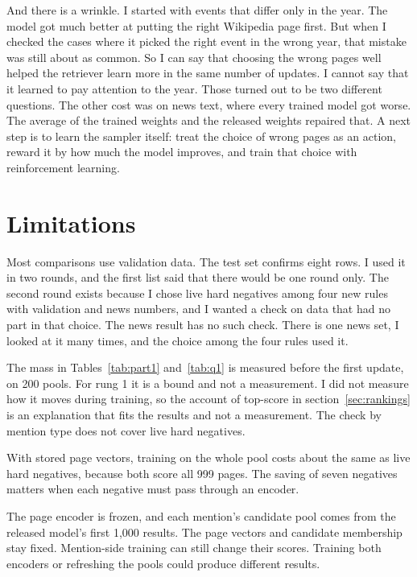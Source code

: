\documentclass[11pt]{article}
\theoremstyle{definition}
\begin{document}
And there is a wrinkle. I started with events that differ only in the year. The model got much better at putting the right Wikipedia page first. But when I checked the cases where it picked the right event in the wrong year, that mistake was still about as common. So I can say that choosing the wrong pages well helped the retriever learn more in the same number of updates. I cannot say that it learned to pay attention to the year. Those turned out to be two different questions. The other cost was on news text, where every trained model got worse. The average of the trained weights and the released weights repaired that. A next step is to learn the sampler itself: treat the choice of wrong pages as an action, reward it by how much the model improves, and train that choice with reinforcement learning.

\section*{Limitations}

Most comparisons use validation data. The test set confirms eight rows. I used it in two rounds, and the first list said that there would be one round only. The second round exists because I chose live hard negatives among four new rules with validation and news numbers, and I wanted a check on data that had no part in that choice. The news result has no such check. There is one news set, I looked at it many times, and the choice among the four rules used it.

The mass in Tables~\ref{tab:part1} and~\ref{tab:q1} is measured before the first update, on 200 pools. For rung 1 it is a bound and not a measurement. I did not measure how it moves during training, so the account of top-score in section~\ref{sec:rankings} is an explanation that fits the results and not a measurement. The check by mention type does not cover live hard negatives.

With stored page vectors, training on the whole pool costs about the same as live hard negatives, because both score all 999 pages. The saving of seven negatives matters when each negative must pass through an encoder.

The page encoder is frozen, and each mention's candidate pool comes from the released model's first 1,000 results. The page vectors and candidate membership stay fixed. Mention-side training can still change their scores. Training both encoders or refreshing the pools could produce different results.
\end{document}
